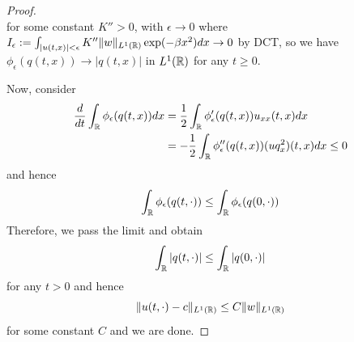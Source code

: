 \begin{proof}
\[    \]
    for some constant $K'' > 0$, with $\epsilon \to 0$ where $I_{\epsilon}:= \int_{|u(t,x)| < \epsilon} K''\lVert w\rVert_{L^1(\mathbb{R})}\exp(-\beta x^2)dx \to 0$ by DCT, so we have $\phi_{\epsilon}(q(t,x)) \to |q(t,x)|$ in $L^1(\mathbb{R})$ for any $t \geq 0$.\par
    Now, consider
    \[
    \begin{aligned}
        \dfrac{d}{dt}\int_{\mathbb{R}} \phi_{\epsilon}(q(t,x))dx  &= \dfrac{1}{2}\int_{\mathbb{R}} \phi_{\epsilon}'(q(t,x))u_{xx}(t,x)dx \\
        &= -\dfrac{1}{2}\int_{\mathbb{R}}\phi_{\epsilon}''(q(t,x)) (uq_x^2)(t,x)dx \leq 0
    \end{aligned}
    \]
    and hence
    \[
    \int_{\mathbb{R}} \phi_{\epsilon}(q(t,\cdot)) \leq \int_{\mathbb{R}} \phi_{\epsilon}(q(0,\cdot))
    \]
    Therefore, we pass the limit and obtain
    \[
    \int_{\mathbb{R}} |q(t,\cdot)| \leq \int_{\mathbb{R}}|q(0,\cdot)|
    \]
    for any $t > 0$ and hence
    \[
    \lVert u(t,\cdot) - c\rVert_{L^1(\mathbb{R})} \leq C\lVert w\rVert_{L^1(\mathbb{R})}
    \]
    for some constant $C$ and we are done.
\end{proof}

